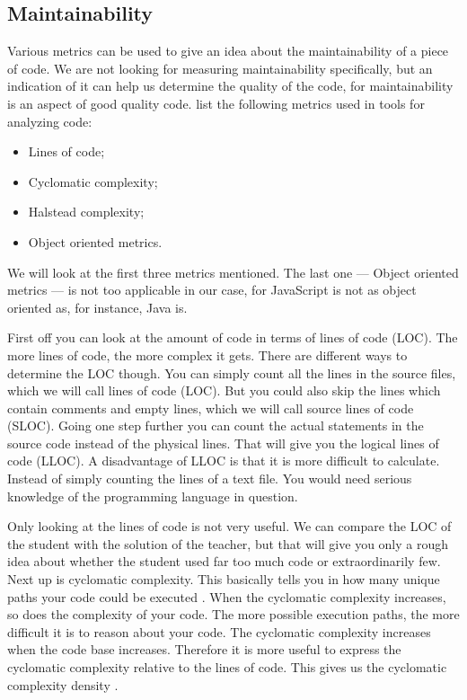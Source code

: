 \documentclass{article}
\begin{document}
\subsection{Maintainability}

Various metrics can be used to give an idea about the maintainability of a
piece of code. We are not looking for measuring maintainability specifically,
but an indication of it can help us determine the quality of the code, for
maintainability is an aspect of good quality code. \citet{rakic2013problems}
list the following metrics used in tools for analyzing code:
\begin{itemize}
  \item Lines of code;
  \item Cyclomatic complexity;
  \item Halstead complexity;
  \item Object oriented metrics.
\end{itemize}
We will look at the first three metrics mentioned. The last one --- Object
oriented metrics --- is not too applicable in our case, for JavaScript is not
as object oriented as, for instance, Java is.

First off you can look at the amount of code in terms of lines of code
(LOC). The more lines of code, the more complex it gets. There are different
ways to determine the LOC though. You can simply count all the lines in the
source files, which we will call lines of code (LOC). But you could also skip
the lines which contain comments and empty lines, which we will call source
lines of code (SLOC). Going one step further you can count the actual
statements in the source code instead of the physical lines. That will give
you the logical lines of code (LLOC). A disadvantage of LLOC is that it is more
difficult to calculate. Instead of simply counting the lines of a text
file. You would need serious knowledge of the programming language in question.

Only looking at the lines of code is not very useful. We can compare the LOC of
the student with the solution of the teacher, but that will give you only a
rough idea about whether the student used far too much code or extraordinarily
few. Next up is cyclomatic complexity. This basically tells you in how many
unique paths your code could be executed \citep{website:js-complexity}. When
the cyclomatic complexity increases, so does the complexity of your code. The
more possible execution paths, the more difficult it is to reason about your
code. The cyclomatic complexity increases when the code base
increases. Therefore it is more useful to express the cyclomatic complexity
relative to the lines of code. This gives us the cyclomatic complexity density
\citep{gill1991cyclomatic}.
\end{document}
